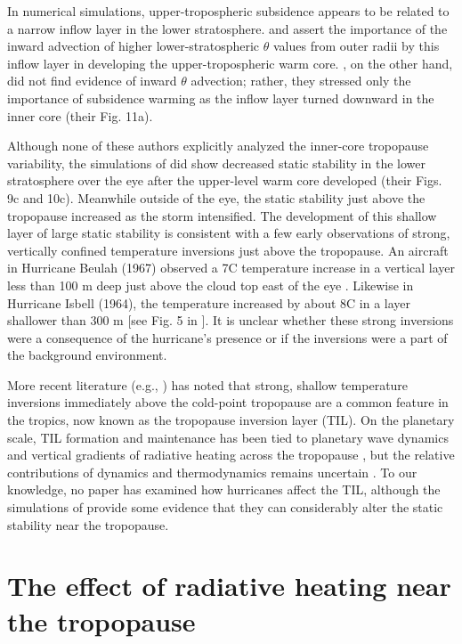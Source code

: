 In numerical simulations, upper-tropospheric subsidence appears to be related to a narrow inflow layer in the lower stratosphere.
\cite{ChenZhang2013} and \cite{ChenGopalakrishnan2015} assert the importance of the inward advection of higher lower-stratospheric $\theta$ values from outer radii by this inflow layer in developing the upper-tropospheric warm core.
\cite{Kieuetal2016}, on the other hand, did not find evidence of inward $\theta$ advection; rather, they stressed only the importance of subsidence warming as the inflow layer turned downward in the inner core (their Fig. 11a).

Although none of these authors explicitly analyzed the inner-core tropopause variability, the simulations of \cite{OhnoSatoh2015} did show decreased static stability in the lower stratosphere over the eye after the upper-level warm core developed (their Figs. 9c and 10c).
Meanwhile outside of the eye, the static stability just above the tropopause increased as the storm intensified.
The development of this shallow layer of large static stability is consistent with a few early observations of strong, vertically confined temperature inversions just above the tropopause.
An aircraft in Hurricane Beulah (1967) observed a 7\textdegree{}C temperature increase in a vertical layer less than 100 m deep just above the cloud top east of the eye \citep{Waco1970}.
Likewise in Hurricane Isbell (1964), the temperature increased by about 8\textdegree{}C in a layer shallower than 300 m [see Fig. 5 in \cite{Gentry1967}].
It is unclear whether these strong inversions were a consequence of the hurricane’s presence or if the inversions were a part of the background environment.

More recent literature (e.g., \cite{Wirth2003}) has noted that strong, shallow temperature inversions immediately above the cold-point tropopause are a common feature in the tropics, now known as the tropopause inversion layer (TIL).
On the planetary scale, TIL formation and maintenance has been tied to planetary wave dynamics \cite{Griseetal2010} and vertical gradients of radiative heating across the tropopause \citep{Randeletal2007}, but the relative contributions of dynamics and thermodynamics remains uncertain \citep{Ferreiraetal2016}.
To our knowledge, no paper has examined how hurricanes affect the TIL, although the simulations of \cite{OhnoSatoh2015} provide some evidence that they can considerably alter the static stability near the tropopause.

\section{The effect of radiative heating near the tropopause}

